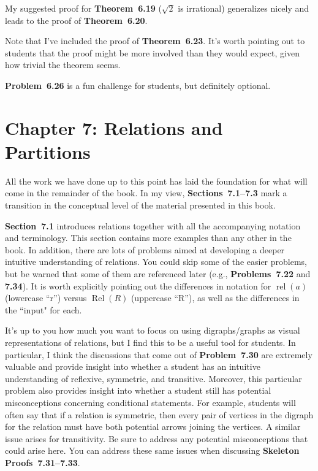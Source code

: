 \documentclass[11pt]{article}%
\newcommand{\blankline}{\pagebreak[2]\vspace{.5\baselineskip}}
\DeclareMathOperator{\rel}{rel}
\DeclareMathOperator{\Rel}{Rel}
\begin{document}
\blankline

My suggested proof for \textbf{Theorem~6.19} ($\sqrt{2}$ is irrational) generalizes nicely and leads to the proof of \textbf{Theorem~6.20}.

\blankline

Note that I've included the proof of \textbf{Theorem~6.23}. It's worth pointing out to students that the proof might be more involved than they would expect, given how trivial the theorem seems.

\blankline

\textbf{Problem~6.26} is a fun challenge for students, but definitely optional. 


\section*{Chapter 7: Relations and Partitions}

All the work we have done up to this point has laid the foundation for what will come in the remainder of the book. In my view, \textbf{Sections~7.1--7.3} mark a transition in the conceptual level of the material presented in this book.  

\blankline

\textbf{Section~7.1} introduces relations together with all the accompanying notation and terminology. This section contains more examples than any other in the book.  In addition, there are lots of problems aimed at developing a deeper intuitive understanding of relations.  You could skip some of the easier problems, but be warned that some of them are referenced later (e.g., \textbf{Problems~7.22} and \textbf{7.34}).  It is worth explicitly pointing out the differences in notation for $\rel(a)$ (lowercase ``r'') versus $\Rel(R)$ (uppercase ``R''), as well as the differences in the ``input" for each.

\blankline

It's up to you how much you want to focus on using digraphs/graphs as visual representations of relations, but I find this to be a useful tool for students. In particular, I think the discussions that come out of \textbf{Problem~7.30} are extremely valuable and provide insight into whether a student has an intuitive understanding of reflexive, symmetric, and transitive.  Moreover, this particular problem also provides insight into whether a student still has potential misconceptions concerning conditional statements.  For example, students will often say that if a relation is symmetric, then every pair of vertices in the digraph for the relation must have both potential arrows joining the vertices. A similar issue arises for transitivity. Be sure to address any potential misconceptions that could arise here. You can address these same issues when discussing \textbf{Skeleton Proofs~7.31--7.33}.
\end{document}
